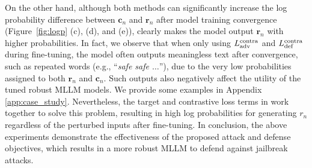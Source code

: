 On the other hand, although both methods can significantly increase the log probability difference between $\mathbf{c}_n$ and $\mathbf{r}_n$ after model training convergence (Figure~\ref{fig:logp} (c), (d), and (e)), {\name} clearly makes the model output $\mathbf{r}_n$ with higher probabilities. In fact, we observe that when only using $L^{\rm contra}_{\rm adv}$ and $L^{\rm contra}_{\rm def}$ during fine-tuning, the model often outputs meaningless text after convergence, such as repeated words (e.g., ``\textit{safe safe $\dots$}''), due to the very low probabilities assigned to both $\mathbf{r}_n$ and $\mathbf{c}_n$. Such outputs also negatively affect the utility of the tuned robust MLLM models. We provide some examples in Appendix \textcolor{red}{\ref{app:case_study}}.
Nevertheless, the target and contrastive loss terms in {\name} work together to solve this problem, resulting in high log probabilities for generating $r_n$ regardless of the perturbed inputs after fine-tuning. In conclusion, the above experiments demonstrate the effectiveness of the proposed attack and defense objectives, which results in a more robust MLLM to defend against jailbreak attacks.






